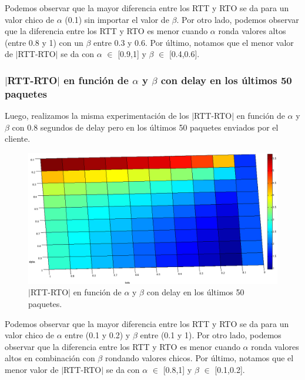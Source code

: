 \documentclass[10pt, a4paper]{article}
\begin{document}
Podemos observar que la mayor diferencia entre los RTT y RTO se da para un valor chico de $\alpha$ (0.1) sin importar el valor de $\beta$.
Por otro lado, podemos observar que la diferencia entre los RTT y RTO es menor cuando $\alpha$ ronda valores altos (entre 0.8 y 1) con un $\beta$ entre 0.3 y 0.6.
Por último, notamos que el menor valor de $|$RTT-RTO$|$ se da con $\alpha$ $\in$ [0.9,1] y $\beta$ $\in$ [0.4,0.6].

\subsubsection{$|$RTT-RTO$|$ en función de $\alpha$ y $\beta$ con delay en los últimos 50 paquetes}
Luego, realizamos la misma experimentación de los $|$RTT-RTO$|$ en función de $\alpha$ y $\beta$ con 0.8 segundos de delay pero en los últimos 50 paquetes enviados por el cliente.


\begin{figure}[H]
\begin{center}
\includegraphics[width=17cm]{delay-50L-costado.png}
\caption{$|$RTT-RTO$|$ en función de $\alpha$ y $\beta$ con delay en los últimos 50 paquetes.}
\end{center}
\end{figure}

Podemos observar que la mayor diferencia entre los RTT y RTO se da para un valor chico de $\alpha$ entre (0.1 y 0.2) y $\beta$ entre (0.1 y 1).
Por otro lado, podemos observar que la diferencia entre los RTT y RTO es menor cuando $\alpha$ ronda valores altos en combinación con $\beta$ rondando valores chicos.
Por último, notamos que el menor valor de $|$RTT-RTO$|$ se da con $\alpha$ $\in$ [0.8,1] y $\beta$ $\in$ [0.1,0.2].
\end{document}
